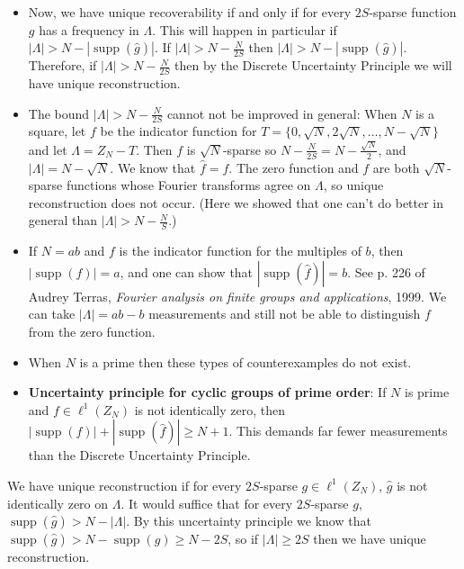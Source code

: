 \documentclass{slides}
\DeclareMathOperator{\supp}{supp}
\begin{document}
\begin{slide}
\begin{itemize}
\item Now, we have unique recoverability if and only if for every
$2S$-sparse function $g$ has a frequency in $\Lambda$. This will happen 
in particular if $|\Lambda|>N-|\supp(\hat{g})|$.
If
$|\Lambda|>N-\frac{N}{2S}$ then
$|\Lambda|>N-|\supp(\hat{g})|$. Therefore, if $|\Lambda|>N-\frac{N}{2S}$
then
by the Discrete Uncertainty Principle
we will have unique reconstruction.

\item The bound $|\Lambda|>N-\frac{N}{2S}$ cannot not be improved
in general:
When $N$ is a square, let $f$ be the indicator function for
$T=\{0,\sqrt{N},2\sqrt{N},\ldots,N-\sqrt{N}\}$
and let $\Lambda=Z_N-T$. Then $f$ is $\sqrt{N}$-sparse
so $N-\frac{N}{2S}=N-\frac{\sqrt{N}}{2}$,
and $|\Lambda|=N-\sqrt{N}$. We know that $\hat{f}=f$.
The zero function and $f$ are both $\sqrt{N}$-sparse
functions whose Fourier transforms agree on $\Lambda$, so
unique reconstruction does not occur.
(Here we showed that one can't do better in general than
$|\Lambda|>N-\frac{N}{S}$.)
\end{itemize}
\end{slide}

\begin{slide}
\begin{itemize}
\item If $N=ab$ and $f$ is the indicator function for
the multiples of $b$, then $|\supp(f)|=a$,
and one can show that $|\supp(\hat{f})|=b$. See
p. 226 of Audrey Terras, {\em Fourier analysis
on finite groups and applications}, 1999. We can take
$|\Lambda|=ab-b$ measurements and still not be able to distinguish
$f$ from the zero function.

\item When $N$ is a prime then these types of counterexamples
do not exist.

\item \textbf{Uncertainty principle for cyclic groups of prime order}:
If $N$ is prime and $f \in \ell^1(Z_N)$ is not identically zero, then
$|\supp(f)|+|\supp(\hat{f})| \geq N+1$. This demands far fewer measurements
than the Discrete Uncertainty Principle.
\end{itemize}
\end{slide}

\begin{slide}
We have unique reconstruction if for every $2S$-sparse
$g \in \ell^1(Z_N)$, $\hat{g}$ is not identically zero on $\Lambda$. It
would suffice that for every $2S$-sparse $g$, $\supp(\hat{g}) > N-|\Lambda|$.
By this uncertainty principle we know that $\supp(\hat{g}) > N-\supp(g)
\geq N-2S$, so if $|\Lambda| \geq 2S$ then we have unique reconstruction.
\end{slide}
\end{document}
